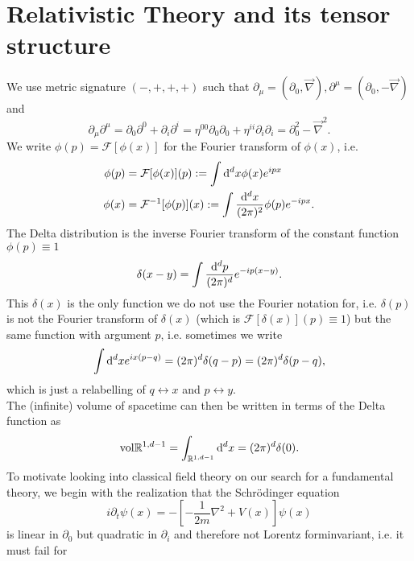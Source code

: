 \chapter{Relativistic Theory and its tensor structure}
We use metric signature $(-,+,+,+)$ such that $\partial_\mu = (\partial_0,\vec{\nabla}), \partial^\mu=(\partial_0,-\vec{\nabla})$ and
\begin{equation}
\partial_\mu \partial^\mu = \partial_0 \partial^0 + \partial_i \partial^i = \eta^{00} \partial_0 \partial_0 + \eta^{ii} \partial_i \partial_i = \partial^2_0 - \vec{\nabla}^2.
\end{equation}
We write $\phi(p)=\mathcal{F}[\phi(x)]$ for the Fourier transform of $\phi(x)$, i.e.  
\begin{align}
\phi(p) &= \mathcal{F}[\phi(x)] (p) := \int \mathrm{d}^d x \phi(x) e^{ipx} \\
\phi(x) &= \mathcal{F}^{-1}[\phi(p)](x) := \int \frac{\mathrm{d}^d x}{(2 \pi)^2} \phi(p) e^{-ipx}.
\end{align}
The Delta distribution is the inverse Fourier transform  of the constant function $\phi(p) \equiv 1$
\begin{equation}
\delta (x-y) =  \int \frac{\mathrm{d}^d p}{(2 \pi)^d} e^{-i p(x-y)}.
\end{equation}
This $\delta(x)$ is the only function we do not use the Fourier notation for, i.e. $\delta(p)$ is not the
Fourier transform of $\delta(x)$ (which is $\mathcal{F}[\delta(x)](p) ≡ 1$) but the same function with argument $p$, i.e.
sometimes we write
\begin{equation}
\int \mathrm{d}^d x e^{i x(p-q)} = (2 \pi)^d \delta(q-p) = (2 \pi)^d \delta(p-q),
\end{equation}
which is just a relabelling of $q \leftrightarrow x$ and $p \leftrightarrow y$.\\
The (infinite) volume of spacetime can then be written in terms of the Delta function as
\begin{equation}
\mathrm{vol}\mathbb{R}^{1,d-1} = \int_{\mathbb{R}^{1,d-1}} \mathrm{d}^d x = (2 \pi)^d \delta(0).
\end{equation} 
To motivate looking into classical field theory on our search for a fundamental theory, we begin with the realization that the Schrödinger equation
\begin{equation}
\label{eq:schroedingereq}
i\partial_t \psi(x) = - \left[- \frac{1}{2m} \nabla^2 + V(x)\right]\psi(x)
\end{equation}
is linear in $\partial_0$ but quadratic in $\partial_i$ and therefore not Lorentz forminvariant, i.e. it must fail for
